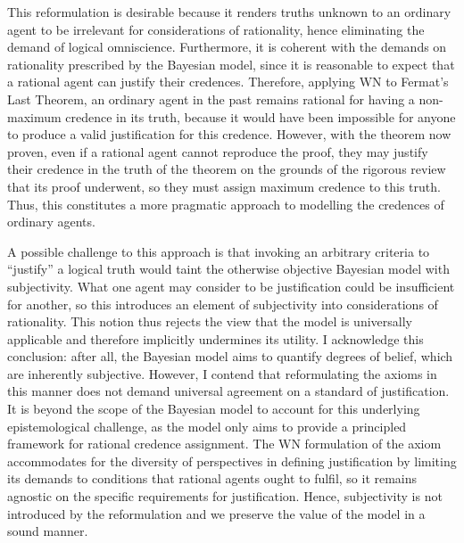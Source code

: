 \documentclass[12pt]{article}
\begin{document}
This reformulation is desirable because it renders truths unknown to an ordinary agent to be irrelevant for considerations of rationality, hence eliminating the demand of logical omniscience. Furthermore, it is coherent with the demands on rationality prescribed by the Bayesian model, since it is reasonable to expect that a rational agent can justify their credences. Therefore, applying WN to Fermat's Last Theorem, an ordinary agent in the past remains rational for having a non-maximum credence in its truth, because it would have been impossible for anyone to produce a valid justification for this credence. However, with the theorem now proven, even if a rational agent cannot reproduce the proof, they may justify their credence in the truth of the theorem on the grounds of the rigorous review that its proof underwent, so they must assign maximum credence to this truth. Thus, this constitutes a more pragmatic approach to modelling the credences of ordinary agents.

A possible challenge to this approach is that invoking an arbitrary criteria to ``justify'' a logical truth would taint the otherwise objective Bayesian model with subjectivity. What one agent may consider to be justification could be insufficient for another, so this introduces an element of subjectivity into considerations of rationality. This notion thus rejects the view that the model is universally applicable and therefore implicitly undermines its utility. I acknowledge this conclusion: after all, the Bayesian model aims to quantify degrees of belief, which are inherently subjective. However, I contend that reformulating the axioms in this manner does not demand universal agreement on a standard of justification. It is beyond the scope of the Bayesian model to account for this underlying epistemological challenge, as the model only aims to provide a principled framework for rational credence assignment. The WN formulation of the axiom accommodates for the diversity of perspectives in defining justification by limiting its demands to conditions that rational agents ought to fulfil, so it remains agnostic on the specific requirements for justification. Hence, subjectivity is not introduced by the reformulation and we preserve the value of the model in a sound manner.
\end{document}

